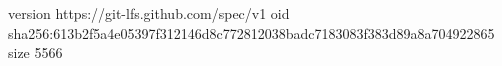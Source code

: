 version https://git-lfs.github.com/spec/v1
oid sha256:613b2f5a4e05397f312146d8c772812038badc7183083f383d89a8a704922865
size 5566
